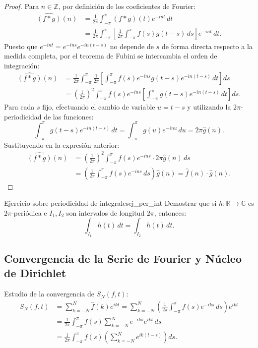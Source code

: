 \begin{proof}
Para $n \in \mathbb{Z}$, por definición de los coeficientes de Fourier:
\begin{align*}
\widehat{(f * g)}(n) &= \frac{1}{2\pi} \int_{-\pi}^\pi (f * g)(t) e^{-int} \, dt \\
&= \frac{1}{2\pi} \int_{-\pi}^\pi \left[ \frac{1}{2\pi} \int_{-\pi}^\pi f(s) g(t - s) \, ds \right] e^{-int} \, dt.
\end{align*}
Puesto que $e^{-int} = e^{-ins} e^{-in(t - s)}$ no depende de $s$ de forma directa respecto a la medida completa, por el teorema de Fubini se intercambia el orden de integración:
\begin{align*}
\widehat{(f * g)}(n) &= \frac{1}{2\pi} \int_{-\pi}^\pi \frac{1}{2\pi} \left[ \int_{-\pi}^\pi f(s) e^{-ins} g(t - s) e^{-in(t - s)} \, dt \right] ds \\
&= \left(\frac{1}{2\pi}\right)^2 \int_{-\pi}^\pi f(s) e^{-ins} \left[ \int_{-\pi}^\pi g(t - s) e^{-in(t - s)} \, dt \right] ds.
\end{align*}
Para cada $s$ fijo, efectuando el cambio de variable $u = t - s$ y utilizando la $2\pi$-periodicidad de las funciones:
\[
\int_{-\pi}^\pi g(t - s) e^{-in(t - s)} \, dt = \int_{-\pi}^\pi g(u) e^{-inu} \, du = 2\pi \hat{g}(n).
\]
Sustituyendo en la expresión anterior:
\begin{align*}
\widehat{(f * g)}(n) &= \left(\frac{1}{2\pi}\right)^2 \int_{-\pi}^\pi f(s) e^{-ins} \cdot 2\pi \hat{g}(n) \, ds \\
&= \left( \frac{1}{2\pi} \int_{-\pi}^\pi f(s) e^{-ins} \, ds \right) \hat{g}(n) = \hat{f}(n) \cdot \hat{g}(n).
\end{align*}
\end{proof}

\begin{nota}{Ejercicio sobre periodicidad de integrales}{ej_per_int}
Demostrar que si $h\colon \mathbb{R} \to \mathbb{C}$ es $2\pi$-periódica e $I_1, I_2$ son intervalos de longitud $2\pi$, entonces:
\[
\int_{I_1} h(t) \, dt = \int_{I_2} h(t) \, dt.
\]
\end{nota}

\subsection{Convergencia de la Serie de Fourier y Núcleo de Dirichlet}

Estudio de la convergencia de $S_N(f, t)$:
\begin{align*}
S_N(f, t) &= \sum_{k=-N}^N \hat{f}(k) e^{ikt} = \sum_{k=-N}^N \left( \frac{1}{2\pi} \int_{-\pi}^\pi f(s) e^{-iks} \, ds \right) e^{ikt} \\
&= \frac{1}{2\pi} \int_{-\pi}^\pi f(s) \sum_{k=-N}^N e^{-iks} e^{ikt} \, ds \\
&= \frac{1}{2\pi} \int_{-\pi}^\pi f(s) \left( \sum_{k=-N}^N e^{ik(t - s)} \right) ds.
\end{align*}

